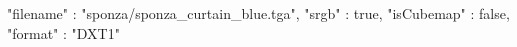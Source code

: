 { 
	"filename" : "sponza/sponza_curtain_blue.tga", 
	"srgb" : true,
	"isCubemap" : false,
	"format" : "DXT1"
}